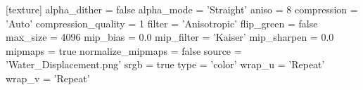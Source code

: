 [texture]
alpha_dither = false
alpha_mode = 'Straight'
aniso = 8
compression = 'Auto'
compression_quality = 1
filter = 'Anisotropic'
flip_green = false
max_size = 4096
mip_bias = 0.0
mip_filter = 'Kaiser'
mip_sharpen = 0.0
mipmaps = true
normalize_mipmaps = false
source = 'Water_Displacement.png'
srgb = true
type = 'color'
wrap_u = 'Repeat'
wrap_v = 'Repeat'